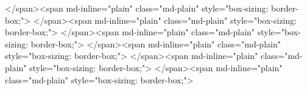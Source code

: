 </span><span md-inline="plain" class="md-plain" style="box-sizing: border-box;">%
</span><span md-inline="plain" class="md-plain" style="box-sizing: border-box;">%
</span><span md-inline="plain" class="md-plain" style="box-sizing: border-box;">%
</span><span md-inline="plain" class="md-plain" style="box-sizing: border-box;">%
</span><span md-inline="plain" class="md-plain" style="box-sizing: border-box;">%
</span><span md-inline="plain" class="md-plain" style="box-sizing: border-box;">%
